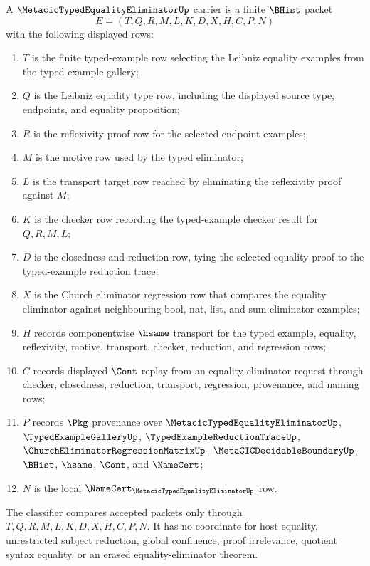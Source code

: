 \begin{definition}
\label{def:metacic-typed-equality-eliminator-carrier}
A $\MetacicTypedEqualityEliminatorUp$ carrier is a finite $\BHist$ packet
$$
E=(T,Q,R,M,L,K,D,X,H,C,P,N)
$$
with the following displayed rows:
\begin{enumerate}
\item $T$ is the finite typed-example row selecting the Leibniz equality examples from the typed example gallery;
\item $Q$ is the Leibniz equality type row, including the displayed source type, endpoints, and equality proposition;
\item $R$ is the reflexivity proof row for the selected endpoint examples;
\item $M$ is the motive row used by the typed eliminator;
\item $L$ is the transport target row reached by eliminating the reflexivity proof against $M$;
\item $K$ is the checker row recording the typed-example checker result for $Q,R,M,L$;
\item $D$ is the closedness and reduction row, tying the selected equality proof to the typed-example reduction trace;
\item $X$ is the Church eliminator regression row that compares the equality eliminator against neighbouring bool, nat, list, and sum eliminator examples;
\item $H$ records componentwise $\hsame$ transport for the typed example, equality, reflexivity, motive, transport, checker, reduction, and regression rows;
\item $C$ records displayed $\Cont$ replay from an equality-eliminator request through checker, closedness, reduction, transport, regression, provenance, and naming rows;
\item $P$ records $\Pkg$ provenance over $\MetacicTypedEqualityEliminatorUp$, $\TypedExampleGalleryUp$, $\TypedExampleReductionTraceUp$, $\ChurchEliminatorRegressionMatrixUp$, $\MetaCICDecidableBoundaryUp$, $\BHist$, $\hsame$, $\Cont$, and $\NameCert$;
\item $N$ is the local $\NameCert_{\MetacicTypedEqualityEliminatorUp}$ row.
\end{enumerate}
The classifier compares accepted packets only through $T,Q,R,M,L,K,D,X,H,C,P,N$. It has no coordinate for host equality, unrestricted subject reduction, global confluence, proof irrelevance, quotient syntax equality, or an erased equality-eliminator theorem.
\end{definition}

